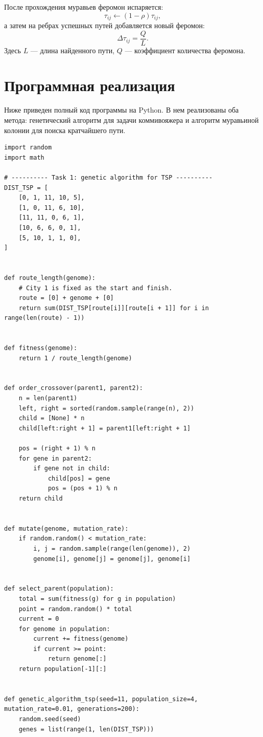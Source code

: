 \documentclass[12pt,a4paper]{article}
\begin{document}
После прохождения муравьев феромон испаряется:
\[
\tau_{ij} \leftarrow (1-\rho)\tau_{ij},
\]
а затем на ребрах успешных путей добавляется новый феромон:
\[
\Delta\tau_{ij}=\frac{Q}{L}.
\]
Здесь $L$ --- длина найденного пути, $Q$ --- коэффициент количества феромона.

\section{Программная реализация}
Ниже приведен полный код программы на Python. В нем реализованы оба метода: генетический алгоритм для задачи коммивояжера и алгоритм муравьиной колонии для поиска кратчайшего пути.

\begin{lstlisting}[caption={Код программы для лабораторной работы №6}]
import random
import math

# ---------- Task 1: genetic algorithm for TSP ----------
DIST_TSP = [
    [0, 1, 11, 10, 5],
    [1, 0, 11, 6, 10],
    [11, 11, 0, 6, 1],
    [10, 6, 6, 0, 1],
    [5, 10, 1, 1, 0],
]


def route_length(genome):
    # City 1 is fixed as the start and finish.
    route = [0] + genome + [0]
    return sum(DIST_TSP[route[i]][route[i + 1]] for i in range(len(route) - 1))


def fitness(genome):
    return 1 / route_length(genome)


def order_crossover(parent1, parent2):
    n = len(parent1)
    left, right = sorted(random.sample(range(n), 2))
    child = [None] * n
    child[left:right + 1] = parent1[left:right + 1]

    pos = (right + 1) % n
    for gene in parent2:
        if gene not in child:
            child[pos] = gene
            pos = (pos + 1) % n
    return child


def mutate(genome, mutation_rate):
    if random.random() < mutation_rate:
        i, j = random.sample(range(len(genome)), 2)
        genome[i], genome[j] = genome[j], genome[i]


def select_parent(population):
    total = sum(fitness(g) for g in population)
    point = random.random() * total
    current = 0
    for genome in population:
        current += fitness(genome)
        if current >= point:
            return genome[:]
    return population[-1][:]


def genetic_algorithm_tsp(seed=11, population_size=4, mutation_rate=0.01, generations=200):
    random.seed(seed)
    genes = list(range(1, len(DIST_TSP)))


\end{lstlisting}
\end{document}
